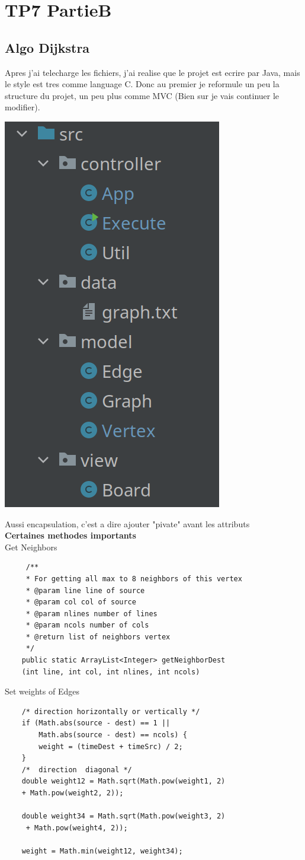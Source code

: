 \documentclass[12pt]{fphw}
\begin{document}
\newpage
\section*{TP7 PartieB}
\subsection*{Algo Dijkstra}
Apres j'ai telecharge les fichiers, j'ai realise que le projet est ecrire par Java, mais le style est tres comme language C. Donc au premier je reformule un peu la structure du projet, un peu plus comme MVC (Bien sur je vais continuer le modifier).\\
\begin{center}
	\includegraphics[width=0.3\columnwidth]{structure_v1.0.png}
\end{center}
Aussi encapsulation, c'est a dire ajouter "pivate" avant les attributs\\

\textbf{Certaines methodes importants}\\
\newline
Get Neighbors
\begin{lstlisting}
     /**
     * For getting all max to 8 neighbors of this vertex
     * @param line line of source
     * @param col col of source
     * @param nlines number of lines
     * @param ncols number of cols
     * @return list of neighbors vertex
     */
    public static ArrayList<Integer> getNeighborDest
	(int line, int col, int nlines, int ncols) 
\end{lstlisting}
\newpage
Set weights of Edges
\begin{lstlisting}
	/* direction horizontally or vertically */
	if (Math.abs(source - dest) == 1 || 
		Math.abs(source - dest) == ncols) {
		weight = (timeDest + timeSrc) / 2;
	}
	/*  direction  diagonal */
	double weight12 = Math.sqrt(Math.pow(weight1, 2) 
	+ Math.pow(weight2, 2));

	double weight34 = Math.sqrt(Math.pow(weight3, 2)
	 + Math.pow(weight4, 2));

	weight = Math.min(weight12, weight34);
\end{lstlisting}
\end{document}
